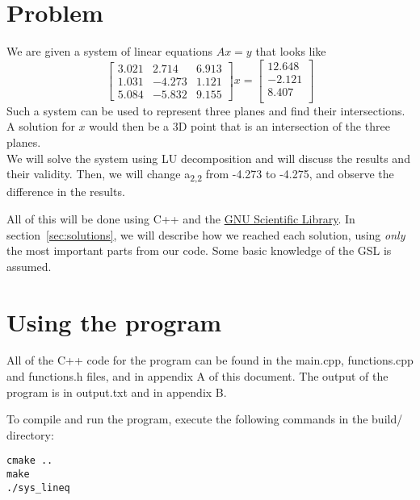 \documentclass[11pt, a4paper, titlepage, openright]{article}
\begin{document}

\tableofcontents
\newpage

\section{Problem}
    We are given a system of linear equations \(Ax = y\) that looks like
    \[
    \begin{bmatrix}
        3.021	&	2.714	&	6.913 \\
        1.031	&	-4.273	&	1.121 \\
        5.084	&	-5.832	&	9.155
    \end{bmatrix}
    x =
    \begin{bmatrix}
        12.648 \\
        -2.121 \\
        8.407  \\
    \end{bmatrix}
    \]
    Such a system can be used to represent three planes and find their intersections. A solution for \(x\) 
    would then be a 3D point that is an intersection of the three planes. \\
    We will solve the system using LU decomposition and will discuss the results and their validity. 
    Then, we will change a\textsubscript{2,2} from -4.273 to -4.275, 
    and observe the difference in the results.

    All of this will be done using C++ and the \href{http://www.gnu.org/software/gsl/}{GNU Scientific Library}.
    In section~\ref{sec:solutions}, we will describe how we reached each solution, using \emph{only} the 
    most important parts from our code. Some basic knowledge of the GSL is assumed.

\bigskip
\bigskip
\section{Using the program}
    All of the C++ code for the program can be found in the main.cpp, functions.cpp and functions.h files, 
    and in appendix A of this document. The output of the program is in output.txt and in appendix B.

    To compile and run the program, execute the following commands in the build/ directory:
\begin{lstlisting}
cmake ..
make
./sys_lineq
\end{lstlisting}

\newpage
\end{document}
